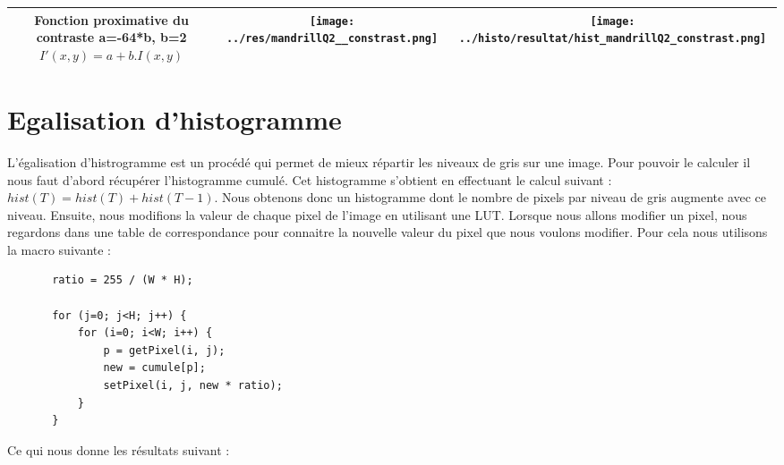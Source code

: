 \documentclass[a4paper,11pt]{article}
\begin{document}
\begin{tabular}{|c|c|c|}
    \hline
    \shortstack{Fonction proximative du contraste \\ a=-64*b, b=2 \\ $I'(x,y)=a+b.I(x,y)$} & \texttt{[image: ../res/mandrillQ2\_\_constrast.png]} & \texttt{[image: ../histo/resultat/hist\_mandrillQ2\_constrast.png]}\\
    \hline
  \end{tabular}
  
  
  \section{Egalisation d'histogramme}
  L'égalisation d'histrogramme est un procédé qui permet de mieux répartir les niveaux de gris sur une image.
  Pour pouvoir le calculer il nous faut d'abord récupérer l'histogramme cumulé. 
  Cet histogramme s'obtient en effectuant le calcul suivant : $hist(T)=hist(T)+hist(T-1)$. Nous obtenons donc
  un histogramme dont le nombre de pixels par niveau de gris augmente avec ce niveau. Ensuite, nous modifions la valeur de chaque pixel
  de l'image en utilisant une LUT. Lorsque nous allons modifier un pixel, nous regardons dans une table de correspondance pour 
  connaitre la nouvelle valeur du pixel que nous voulons modifier. Pour cela nous utilisons la macro suivante :
  
  \begin{lstlisting}
       ratio = 255 / (W * H);

       for (j=0; j<H; j++) {
           for (i=0; i<W; i++) {
               p = getPixel(i, j);
               new = cumule[p];
               setPixel(i, j, new * ratio);
           }
       }
  \end{lstlisting}

  Ce qui nous donne les résultats suivant : \\
  
\end{document}
